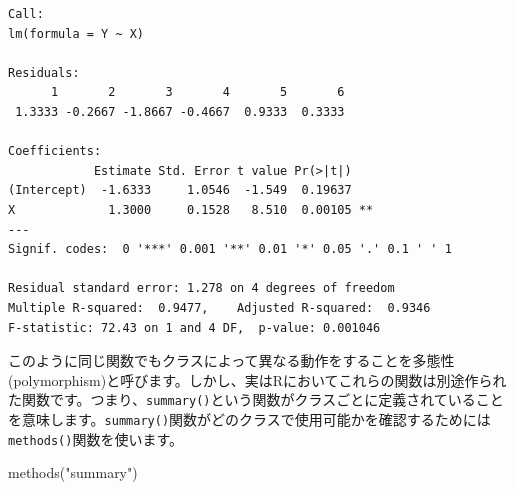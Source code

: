 \documentclass[
  a4paper,
  pandoc,
  ja=standard,
  jafont=haranoaji]{bxjsbook}
\newenvironment{Shaded}{\begin{snugshade}}{\end{snugshade}}
\newcommand{\FunctionTok}[1]{\textcolor[rgb]{0.28,0.35,0.67}{#1}}
\newcommand{\NormalTok}[1]{\textcolor[rgb]{0.00,0.48,0.65}{#1}}
\newcommand{\StringTok}[1]{\textcolor[rgb]{0.13,0.47,0.30}{#1}}
\begin{document}
\begin{verbatim}
Call:
lm(formula = Y ~ X)

Residuals:
      1       2       3       4       5       6 
 1.3333 -0.2667 -1.8667 -0.4667  0.9333  0.3333 

Coefficients:
            Estimate Std. Error t value Pr(>|t|)   
(Intercept)  -1.6333     1.0546  -1.549  0.19637   
X             1.3000     0.1528   8.510  0.00105 **
---
Signif. codes:  0 '***' 0.001 '**' 0.01 '*' 0.05 '.' 0.1 ' ' 1

Residual standard error: 1.278 on 4 degrees of freedom
Multiple R-squared:  0.9477,    Adjusted R-squared:  0.9346 
F-statistic: 72.43 on 1 and 4 DF,  p-value: 0.001046
\end{verbatim}

このように同じ関数でもクラスによって異なる動作をすることを多態性
(polymorphism)と呼びます。しかし、実はRにおいてこれらの関数は別途作られた関数です。つまり、\texttt{summary()}という関数がクラスごとに定義されていることを意味します。\texttt{summary()}関数がどのクラスで使用可能かを確認するためには\texttt{methods()}関数を使います。

\begin{Shaded}
\begin{Highlighting}[numbers=left,,]
\FunctionTok{methods}\NormalTok{(}\StringTok{"summary"}\NormalTok{)}
\end{Highlighting}
\end{Shaded}
\end{document}
